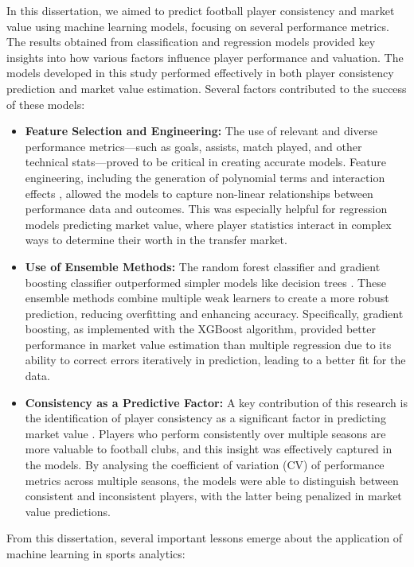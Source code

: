 \documentclass[12pt, a4paper,oneside]{book}
\numberwithin{equation}{section}
\begin{document}
In this dissertation, we aimed to predict football player consistency and market value using machine learning models, focusing on several performance metrics. The results obtained from classification and regression models provided key insights into how various factors influence player performance and valuation. The models developed in this study performed effectively in both player consistency prediction and market value estimation. Several factors contributed to the success of these models:
\begin{itemize}
    \item \textbf{Feature Selection and Engineering:} The use of relevant and diverse performance metrics—such as goals, assists, match played, and other technical stats—proved to be critical in creating accurate models. Feature engineering, including the generation of polynomial terms and interaction effects \cite{Berrar2019} \cite{sarmento2018}, allowed the models to capture non-linear relationships between performance data and outcomes. This was especially helpful for regression models predicting market value, where player statistics interact in complex ways to determine their worth in the transfer market.
    \item \textbf{Use of Ensemble Methods:} The random forest classifier and gradient boosting classifier outperformed simpler models like decision trees \cite{Hastie2009} \cite{chen2016}. These ensemble methods combine multiple weak learners to create a more robust prediction, reducing overfitting and enhancing accuracy. Specifically, gradient boosting, as implemented with the XGBoost algorithm, provided better performance in market value estimation than multiple regression due to its ability to correct errors iteratively in prediction, leading to a better fit for the data.
    \item \textbf{Consistency as a Predictive Factor:} A key contribution of this research is the identification of player consistency as a significant factor in predicting market value \cite{sarmento2018} \cite{Gudmundssonh2017}. Players who perform consistently over multiple seasons are more valuable to football clubs, and this insight was effectively captured in the models. By analysing the coefficient of variation (CV) of performance metrics across multiple seasons, the models were able to distinguish between consistent and inconsistent players, with the latter being penalized in market value predictions.
\end{itemize}
From this dissertation, several important lessons emerge about the application of machine learning in sports analytics:
\end{document}
